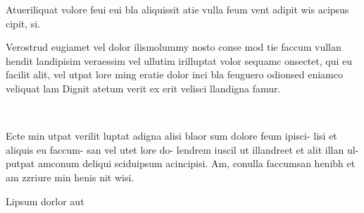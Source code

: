 \documentclass[a4paper,bcor=0mm,9pt,parskip=full,twoside]{tubsartcl}
\begin{document}
\begin{gaussbox}[bgcolor=tubsGray20]{1}{1}{4}{2}
\end{gaussbox}
\begin{gaussbox}[bgcolor=tubsGray20]{5}{1}{2}{1}
\end{gaussbox}
\begin{gaussbox}[bgcolor=tubsGray20]{5}{2}{2}{1}
\end{gaussbox}
\begin{gaussbox}[bgcolor=tuOrangeLight]{1}{3}{6}{6}
\twocolumn[]%
\lipsum[2]\par
\lipsum[2]\par
\end{gaussbox}
\clearpage

\begin{gaussbox}{1}{1}{5}{1}
{\LARGE\sffamily\bfseries\raggedright Atueriliquat volore feui eui bla
aliquissit atie vulla feum vent
adipit wis acipsus cipit, si.\par}
\end{gaussbox}
\begin{gaussbox}[frame=fbox]{2}{2}{5}{1}
\mdseries
Verostrud eugiamet vel dolor ilismolummy nosto conse mod tie
faccum vullan hendit landipisim veraessim vel ullutim irilluptat volor
sequamc onsectet, qui eu facilit alit, vel utpat lore ming eratie dolor
inci bla feuguero odionsed eniamco veliquat lam Dignit atetum verit
ex erit velisci llandigna famur.
\end{gaussbox}
\begin{gaussbox}[c,bgcolor=tuGray20]{1}{3}{5}{6}
\lipsum[2]\par
\lipsum[2]\par
\end{gaussbox}
\clearpage~\clearpage

\begin{gaussbox}[]{1}{1}{1}{1}
\scriptsize\bfseries\raggedright
Ecte min utpat verilit
luptat adigna alisi blaor
sum dolore feum ipisci-
lisi et aliquis eu faccum-
san vel utet lore do-
lendrem iuscil ut
illandreet et alit illan ul-
putpat amconum deliqui
sciduipsum acincipisi.
Am, conulla faccumsan
henibh et am zzriure
min henis nit wisi.
\end{gaussbox}
\begin{gaussbox}[bgcolor=tubsGray20]{2}{1}{3}{1}
\end{gaussbox}
\begin{gaussbox}[b,bgcolor=tubsGray20]{5}{1}{2}{1}
Lipsum dorlor aut
\end{gaussbox}
\begin{gaussbox}[bgcolor=tubsGray20]{2}{2}{5}{2}
\end{gaussbox}
\begin{gaussbox}{2}{4}{5}{2}
\raggedright\sffamily
\lipsum[1]
\end{gaussbox}
\clearpage
\end{document}
